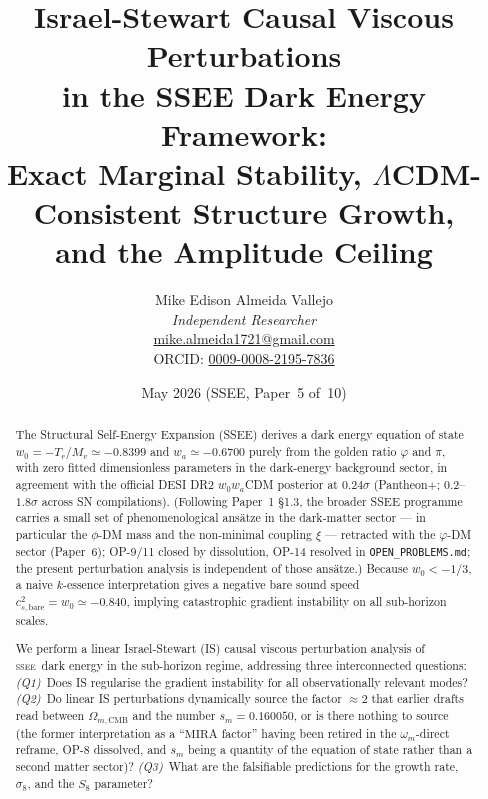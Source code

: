 \documentclass[12pt,a4paper]{article}
\title{\textbf{Israel-Stewart Causal Viscous Perturbations\\
in the SSEE Dark Energy Framework:\\
Exact Marginal Stability, $\Lambda$CDM-Consistent Structure Growth,\\
and the Amplitude Ceiling}}
\author{Mike Edison Almeida Vallejo \\
\small \textit{Independent Researcher} \\
\small \href{mailto:mike.almeida1721@gmail.com}{mike.almeida1721@gmail.com} \\
\small ORCID: \href{https://orcid.org/0009-0008-2195-7836}{0009-0008-2195-7836}
}
\date{May 2026 \quad (SSEE, Paper~5 of~10)}
\newcommand{\SSEE}{\ifmmode\mathrm{SSEE}\else\textsc{ssee}\fi}
\begin{document}
\maketitle

\begin{abstract}
The Structural Self-Energy Expansion (SSEE) derives a dark energy
equation of state $w_0 = -T_r/M_v \simeq -0.8399$ and $w_a \simeq -0.6700$
purely from the golden ratio $\varphi$ and $\pi$, with zero fitted
dimensionless parameters in the dark-energy background sector,
in agreement with the official DESI DR2 $w_0w_a$CDM posterior at $0.24\sigma$ (Pantheon+; $0.2$--$1.8\sigma$ across SN compilations).
(Following Paper~1 \S1.3, the broader SSEE programme carries a small set of
phenomenological ans\"atze in the dark-matter sector --- in particular the
$\phi$-DM mass and the non-minimal coupling $\xi$ --- retracted with the
$\varphi$-DM sector (Paper~6); OP-9/11 closed by dissolution, OP-14 resolved
in \texttt{OPEN\_PROBLEMS.md}; the present perturbation analysis is independent
of those ans\"atze.)
Because $w_0 < -1/3$, a naive $k$-essence interpretation gives a negative
bare sound speed $c^2_{s,\mathrm{bare}} = w_0 \simeq -0.840$, implying catastrophic
gradient instability on all sub-horizon scales.

We perform a linear Israel-Stewart (IS) causal viscous perturbation analysis of \SSEE\ dark energy in the sub-horizon regime,
addressing three interconnected questions:
\emph{(Q1)}~Does IS regularise the gradient instability for all observationally
relevant modes?
\emph{(Q2)}~Do linear IS perturbations dynamically source the factor
$\approx2$ that earlier drafts read between $\Omega_{m,\mathrm{CMB}}$ and the
number $s_m=0.160050$, or is there nothing to source (the former interpretation
as a ``$\mathrm{MIRA}$ factor'' having been retired in the $\omega_m$-direct
reframe, OP-8 dissolved, and $s_m$ being a quantity of the equation of state
rather than a second matter sector)?
\emph{(Q3)}~What are the falsifiable predictions for the growth rate,
$\sigma_8$, and the $S_8$ parameter?


\end{abstract}
\end{document}
